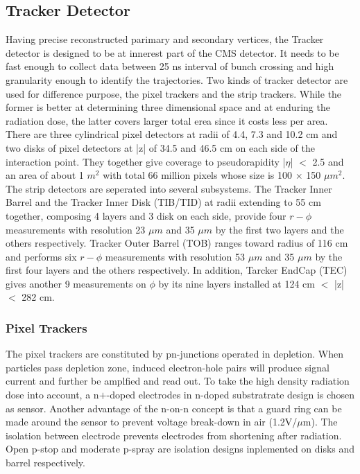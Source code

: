 \subsection{Tracker Detector} 
Having precise reconstructed parimary and secondary vertices, the Tracker detector is designed to be at innerest part of the CMS detector.
It needs to be fast enough to collect data between 25 ns interval of bunch crossing and high granularity enough to identify the trajectories. 
Two kinds of tracker detector are used for difference purpose, the pixel trackers and the strip trackers. 
While the former is better at determining three dimensional space and at enduring the radiation dose, 
the latter covers larger total erea since it costs less per area. 
There are three cylindrical pixel detectors at radii of 4.4, 7.3 and 10.2 cm and two disks of pixel detectors at |z| of 34.5 and 46.5 cm on each side of the interaction point. 
They together give coverage to pseudorapidity |$\eta $| $<$ 2.5 and an area of about 1 $m^2$ with total 66 million pixels whose size is 100 $\times$ 150 $\mu m^2$. 
The strip detectors are seperated into several subsystems. The Tracker Inner Barrel and the Tracker Inner Disk (TIB/TID) at radii extending to 55 cm together, composing 4 layers and 3 disk on each side, 
provide four $r-\phi $ measurements with resolution 23 $\mu m$ and 35 $\mu m$ by the first two layers and the others respectively. 
Tracker Outer Barrel (TOB) ranges toward radius of 116 cm and performs six $r-\phi $ measurements with resolution 53 $\mu m$ and 35 $\mu m$ by the first four layers and the others respectively.
In addition, Tarcker EndCap (TEC) gives another 9 measurements on $\phi $ by its nine layers installed at 124 cm $<$ |z| $<$ 282 cm.
 
\subsubsection{Pixel Trackers}
The pixel trackers are constituted by pn-junctions operated in depletion. 
When particles pass depletion zone, induced electron-hole pairs will produce signal current and further be amplfied and read out. 
To take the high density radiation dose into account, a n$+$-doped electrodes in n-doped substratrate design is chosen as sensor. 
Another advantage of the n-on-n concept is that a guard ring can be made around the sensor to prevent voltage break-down in air (1.2V/$\mu $m). 
The isolation between electrode prevents electrodes from shortening after radiation. Open p-stop and moderate p-spray are isolation designs inplemented on disks and barrel respectively\citep{PixelD}.

